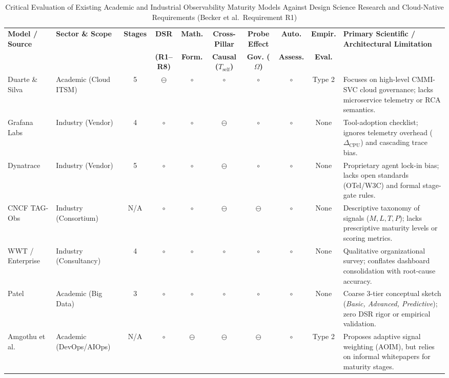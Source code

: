 \begin{table}[t]
\centering
\caption{Critical Evaluation of Existing Academic and Industrial Observability Maturity Models Against Design Science Research and Cloud-Native Requirements (Becker et al.\ Requirement R1)}
\label{tab:existing_models_comparison}
\footnotesize
\setlength{\tabcolsep}{3.5pt}
\renewcommand{\arraystretch}{1.18}
\begin{tabularx}{\textwidth}{l l c c c c c c c >{\raggedright\arraybackslash}X}
\toprule
\textbf{Model / Source} & \textbf{Sector \& Scope} & \textbf{Stages} & \textbf{DSR} & \textbf{Math.} & \textbf{Cross-Pillar} & \textbf{Probe Effect} & \textbf{Auto.} & \textbf{Empir.} & \textbf{Primary Scientific / Architectural Limitation} \\
 & & & \textbf{(R1--R8)} & \textbf{Form.} & \textbf{Causal ($T_{\text{self}}$)} & \textbf{Gov. ($\Omega$)} & \textbf{Assess.} & \textbf{Eval.} & \\
\midrule
Duarte \& Silva~\cite{duarte_2013} & Academic (Cloud ITSM) & 5 & $\ominus$ & $\circ$ & $\circ$ & $\circ$ & $\circ$ & Type 2 & Focuses on high-level CMMI-SVC cloud governance; lacks microservice telemetry or RCA semantics. \\
Grafana Labs~\cite{grafana_omm_2024} & Industry (Vendor) & 4 & $\circ$ & $\circ$ & $\ominus$ & $\circ$ & $\circ$ & None & Tool-adoption checklist; ignores telemetry overhead ($\Delta_{\text{CPU}}$) and cascading trace bias. \\
Dynatrace~\cite{dynatrace_omm_2024} & Industry (Vendor) & 5 & $\circ$ & $\circ$ & $\ominus$ & $\circ$ & $\circ$ & None & Proprietary agent lock-in bias; lacks open standards (OTel/W3C) and formal stage-gate rules. \\
CNCF TAG-Obs~\cite{cncf_obs_2024} & Industry (Consortium) & N/A & $\circ$ & $\circ$ & $\ominus$ & $\ominus$ & $\circ$ & None & Descriptive taxonomy of signals ($M,L,T,P$); lacks prescriptive maturity levels or scoring metrics. \\
WWT / Enterprise~\cite{wwt_omm_2025} & Industry (Consultancy) & 4 & $\circ$ & $\circ$ & $\circ$ & $\circ$ & $\circ$ & None & Qualitative organizational survey; conflates dashboard consolidation with root-cause accuracy. \\
Patel~\cite{patel_2025} & Academic (Big Data) & 3 & $\circ$ & $\circ$ & $\circ$ & $\circ$ & $\circ$ & None & Coarse 3-tier conceptual sketch (\textit{Basic, Advanced, Predictive}); zero DSR rigor or empirical validation. \\
Amgothu et al.~\cite{amgothu_2025} & Academic (DevOps/AIOps) & N/A & $\circ$ & $\ominus$ & $\ominus$ & $\ominus$ & $\circ$ & Type 2 & Proposes adaptive signal weighting (AOIM), but relies on informal whitepapers for maturity stages. \\

\end{tabularx}
\end{table}
